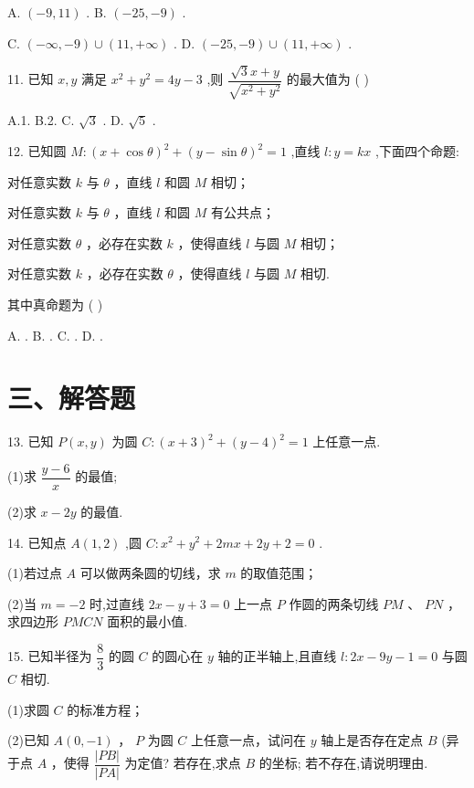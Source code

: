 A. $\left( {-9,{11}}\right)$ . B. $\left( {-{25}, - 9}\right)$ .

C. $\left( {-\infty , - 9}\right)  \cup  \left( {{11}, + \infty }\right)$ . D. $\left( {-{25}, - 9}\right)  \cup  \left( {{11}, + \infty }\right)$ .

11. 已知 $x,y$ 满足 ${x}^{2} + {y}^{2} = {4y} - 3$ ,则 $\dfrac{\sqrt{3}x + y}{\sqrt{{x}^{2} + {y}^{2}}}$ 的最大值为 ( )

A.1. B.2. C. $\sqrt{3}$ . D. $\sqrt{5}$ .

12. 已知圆 $M : {\left( x + \cos \theta \right) }^{2} + {\left( y - \sin \theta \right) }^{2} = 1$ ,直线 $l : y = {kx}$ ,下面四个命题:

  对任意实数 $k$ 与 $\theta$ ，直线 $l$ 和圆 $M$ 相切；

  对任意实数 $k$ 与 $\theta$ ，直线 $l$ 和圆 $M$ 有公共点；

  对任意实数 $\theta$ ，必存在实数 $k$ ，使得直线 $l$ 与圆 $M$ 相切；

  对任意实数 $k$ ，必存在实数 $\theta$ ，使得直线 $l$ 与圆 $M$ 相切.

其中真命题为 ( )

A.     . B.     . C.     . D.     .

\section*{三、解答题}

13. 已知 $P\left( {x,y}\right)$ 为圆 $C : {\left( x + 3\right) }^{2} + {\left( y - 4\right) }^{2} = 1$ 上任意一点.

(1)求 $\dfrac{y - 6}{x}$ 的最值;

(2)求 $x - {2y}$ 的最值.

14. 已知点 $A\left( {1,2}\right)$ ,圆 $C : {x}^{2} + {y}^{2} + {2mx} + {2y} + 2 = 0$ .

(1)若过点 $A$ 可以做两条圆的切线，求 $m$ 的取值范围；

(2)当 $m =  - 2$ 时,过直线 ${2x} - y + 3 = 0$ 上一点 $P$ 作圆的两条切线 ${PM}$ 、 ${PN}$ ，求四边形 ${PMCN}$ 面积的最小值.

15. 已知半径为 $\dfrac{8}{3}$ 的圆 $C$ 的圆心在 $y$ 轴的正半轴上,且直线 $l : {2x} - {9y} - 1 = 0$ 与圆 $C$ 相切.

(1)求圆 $C$ 的标准方程；

(2)已知 $A\left( {0, - 1}\right)$ ， $P$ 为圆 $C$ 上任意一点，试问在 $y$ 轴上是否存在定点 $B$ (异于点 $A$ ，使得 $\dfrac{\left| PB\right| }{\left| PA\right| }$ 为定值? 若存在,求点 $B$ 的坐标; 若不存在,请说明理由.

